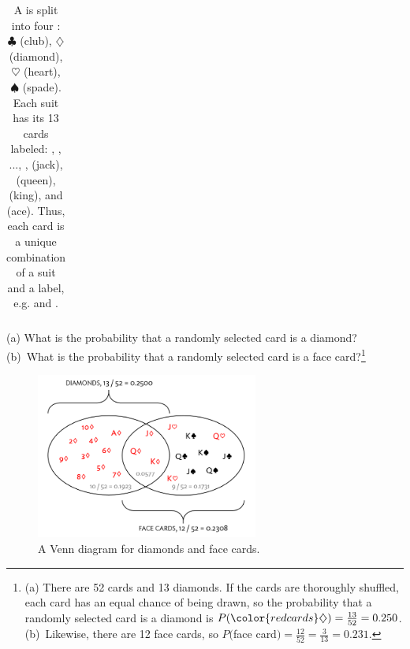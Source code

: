 \begin{doublespace}
\begin{table}[h]
\begin{tabular}{lll lll lll lll l}
\end{tabular}
\caption{A  is split into four : $\clubsuit$ (club), {\color{redcards}$\diamondsuit$} (diamond), {\color{redcards}$\heartsuit$} (heart), $\spadesuit$ (spade). Each suit has its 13 cards labeled: , , ..., ,  (jack),  (queen),  (king), and  (ace). Thus, each card is a unique combination of a suit and a label, e.g. {\color{redcards}} and . %
	}
\label{deckOfCards}
\end{table}

\begin{exercise}
(a) What is the probability that a randomly selected card is a diamond? (b)~What is the probability that a randomly selected card is a face card?\footnote{(a) There are 52 cards and 13 diamonds. If the cards are thoroughly shuffled, each card has an equal chance of being drawn, so the probability that a randomly selected card is a diamond is $P({\color{redcards}\diamondsuit}) = \frac{13}{52} = 0.250$. (b)~Likewise, there are 12 face cards, so $P($face card$) = \frac{12}{52} = \frac{3}{13} = 0.231$.}
\end{exercise}

\begin{figure}[h]
	\centering
	\includegraphics[width=0.65\textwidth]{ch_probability_oi_biostat/figures/cardsDiamondFaceVenn/cardsDiamondFaceVenn.png}
	\caption{A Venn diagram for diamonds and face cards.}
	\label{fig:cardsDiamondFaceVenn}
\end{figure}



\end{doublespace}
